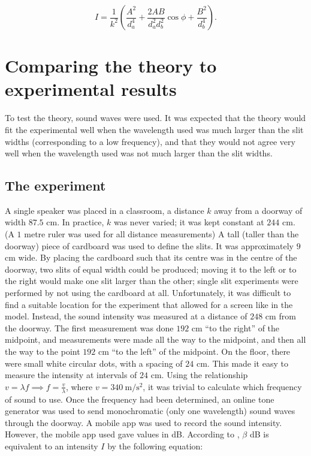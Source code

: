 \documentclass{paper}
\begin{document}
\begin{equation}
\label{eq:expression-for-intensity}
    I = \frac{1}{k^2}\left(\frac{A^2}{d_a^4} + 
    \frac{2AB}{d_{a}^{2}d_{b}^{2}}\cos{\phi} + \frac{B^2}{d_b^4}\right).
\end{equation}

\section{Comparing the theory to experimental results}

To test the theory, sound waves were used. It was expected that the theory
would fit the experimental well when the wavelength used was much larger than
the slit widths (corresponding to a low frequency), and that they would not agree
very well when the wavelength used was not much larger than the slit widths.

\subsection{The experiment}
                
A single speaker was placed in a classroom, a distance $k$ away from a doorway of width $87.5$ cm.
In practice, $k$ was never varied; it was kept constant at $244$ cm. (A $1$ metre ruler was used for all distance measurements) A tall (taller than the doorway) piece of cardboard was used to define the slits. It was approximately $9$ cm wide. By placing the
cardboard such that its centre was in the centre of the doorway, two slits of equal width could be
produced; moving it to the left or to the right would make one slit larger than the other;
single slit experiments were performed by not using the cardboard at all. Unfortunately, it was difficult
to find a suitable location for the experiment that allowed for a screen like in the model. Instead, the
sound intensity was measured at a distance of $248$ cm from the doorway. The first measurement was done
$192$ cm \enquote{to the right} of the midpoint, and measurements were made all the way to the midpoint,
and then all the way to the point $192$ cm \enquote{to the left} of the midpoint. On the floor, there were
small white circular dots, with a spacing of $24$ cm. This made it easy to measure the intensity at intervals
of $24$ cm. Using the relationship $v = \lambda{}f \implies f = \frac{v}{\lambda}$, where $v = \SI{340}{\m\per\square\s}$, 
it was trivial to calculate which frequency of sound to use. Once the frequency had been determined,
an online tone generator \parencite{tone-generator} was used to send monochromatic
(only one wavelength) sound waves through the doorway. A mobile app \parencite{sound-meter} was used to record the sound
intensity. However, the mobile app used gave values in dB. According to \parencite{decibel-to-intensity}, $\beta$ dB
is equivalent to an intensity $I$ by the following equation:
\end{document}
